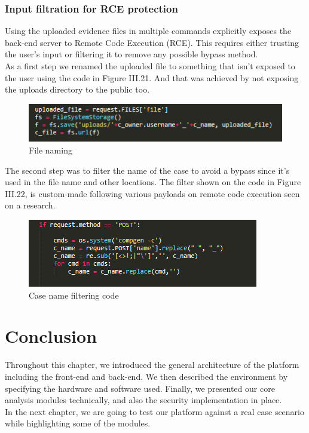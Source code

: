 \subsubsection{Input filtration for RCE protection}
Using the uploaded evidence files in multiple commands explicitly exposes the back-end server to Remote Code Execution (RCE). This requires either trusting the user's input or filtering it to remove any possible bypass method.\\
As a first step we renamed the uploaded file to something that isn't exposed to the user using the code in Figure III.21. And that was achieved by not exposing the uploads directory to the public too.
\begin{figure}[H]
\centering
\includegraphics[width=0.8\columnwidth]{Figures/filename.png}
\caption{File naming}
\end{figure}
The second step was to filter the name of the case to avoid a bypass since it's used in the file name and other locations. The filter shown on the code in Figure III.22, is custom-made following various payloads on remote code execution seen on a research\cite{payloadsallthings}.
\begin{figure}[H]
\centering
\includegraphics[width=0.8\columnwidth]{Figures/filter.png}
\caption{Case name filtering code}
\end{figure}




\section*{Conclusion}

Throughout this chapter, we introduced the general architecture of the platform including the front-end and back-end. We then described the environment by specifying the hardware and software used. Finally, we presented our core analysis modules technically, and also the security implementation in place.\\
In the next chapter, we are going to test our platform against a real case scenario while highlighting some of the modules.